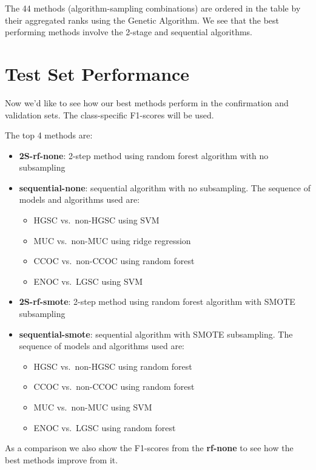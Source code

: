 \documentclass[
]{report}
\providecommand{\tightlist}{%
  \setlength{\itemsep}{0pt}\setlength{\parskip}{0pt}}
\begin{document}
The 44 methods (algorithm-sampling combinations) are ordered in the table by their aggregated ranks using the Genetic Algorithm. We see that the best performing methods involve the 2-stage and sequential algorithms.

\hypertarget{test-set-performance}{%
\section{Test Set Performance}\label{test-set-performance}}

Now we'd like to see how our best methods perform in the confirmation and validation sets. The class-specific F1-scores will be used.

The top 4 methods are:

\begin{itemize}
\tightlist
\item
  \textbf{2S-rf-none}: 2-step method using random forest algorithm with no subsampling
\item
  \textbf{sequential-none}: sequential algorithm with no subsampling. The sequence of models and algorithms used are:

  \begin{itemize}
  \tightlist
  \item
    HGSC vs.~non-HGSC using SVM
  \item
    MUC vs.~non-MUC using ridge regression
  \item
    CCOC vs.~non-CCOC using random forest
  \item
    ENOC vs.~LGSC using SVM
  \end{itemize}
\item
  \textbf{2S-rf-smote}: 2-step method using random forest algorithm with SMOTE subsampling
\item
  \textbf{sequential-smote}: sequential algorithm with SMOTE subsampling. The sequence of models and algorithms used are:

  \begin{itemize}
  \tightlist
  \item
    HGSC vs.~non-HGSC using random forest
  \item
    CCOC vs.~non-CCOC using random forest
  \item
    MUC vs.~non-MUC using SVM
  \item
    ENOC vs.~LGSC using random forest
  \end{itemize}
\end{itemize}

As a comparison we also show the F1-scores from the \textbf{rf-none} to see how the best methods improve from it.
\end{document}
